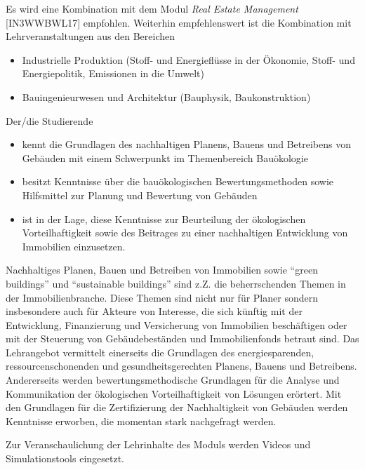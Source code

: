 \begin{module}
\begin{styleenv}
\begin{recommendations}Es wird eine Kombination mit dem Modul \emph{Real Estate Management} [IN3WWBWL17] empfohlen.\newline
Weiterhin empfehlenswert ist die Kombination mit Lehrveranstaltungen aus den Bereichen

 \begin{itemize}\item Industrielle Produktion (Stoff- und Energieflüsse in der Ökonomie, Stoff- und Energiepolitik, Emissionen in die Umwelt)  \item Bauingenieurwesen und Architektur (Bauphysik, Baukonstruktion)  \end{itemize}\end{recommendations}
\end{styleenv}

\begin{learningoutcomes}
Der/die Studierende

 \begin{itemize}\item kennt die Grundlagen des nachhaltigen Planens, Bauens und Betreibens von Gebäuden mit einem Schwerpunkt im Themenbereich Bauökologie  \item besitzt Kenntnisse über die bauökologischen Bewertungsmethoden sowie Hilfsmittel zur Planung und Bewertung von Gebäuden  \item ist in der Lage, diese Kenntnisse zur Beurteilung der ökologischen Vorteilhaftigkeit sowie des Beitrages zu einer nachhaltigen Entwicklung von Immobilien einzusetzen.  \end{itemize}
\end{learningoutcomes}

\begin{content}
Nachhaltiges Planen, Bauen und Betreiben von Immobilien sowie “green buildings” und “sustainable buildings” sind z.Z. die beherrschenden Themen in der Immobilienbranche. Diese Themen sind nicht nur für Planer sondern insbesondere auch für Akteure von Interesse, die sich künftig mit der Entwicklung, Finanzierung und Versicherung von Immobilien beschäftigen oder mit der Steuerung von Gebäudebeständen und Immobilienfonds betraut sind.\newline
Das Lehrangebot vermittelt einerseits die Grundlagen des energiesparenden, ressourcenschonenden und gesundheitsgerechten Planens, Bauens und Betreibens. Andererseits werden bewertungsmethodische Grundlagen für die Analyse und Kommunikation der ökologischen Vorteilhaftigkeit von Lösungen erörtert. Mit den Grundlagen für die Zertifizierung der Nachhaltigkeit von Gebäuden werden Kenntnisse erworben, die momentan stark nachgefragt werden.

 

Zur Veranschaulichung der Lehrinhalte des Moduls werden Videos und Simulationstools eingesetzt.


\end{content}



\end{module}

